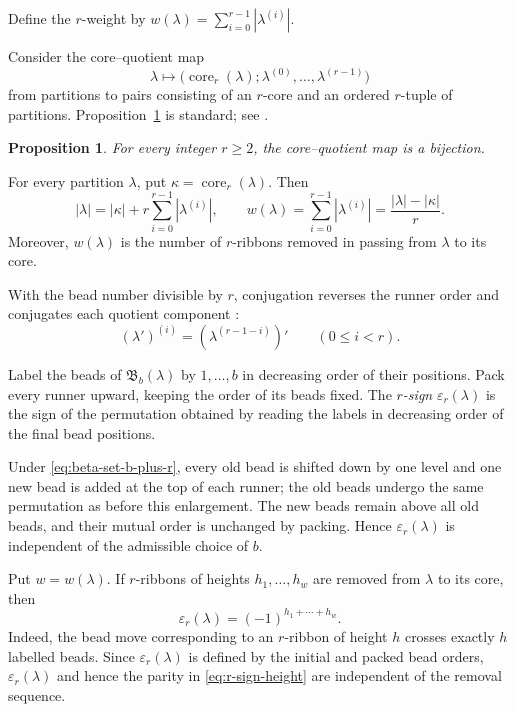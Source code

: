 \documentclass[12pt,reqno,a4paper]{amsart}
\numberwithin{equation}{section}
\numberwithin{figure}{section}
\theoremstyle{plain}
\newtheorem{proposition}[theorem]{Proposition}
\theoremstyle{definition}
\newcommand{\eps}{\varepsilon}
\begin{document}
Define the $r$-weight by
$w(\lambda)=\sum_{i=0}^{r-1}|\lambda^{(i)}|$.

Consider the core--quotient map
\[
 \lambda\longmapsto
 \bigl(\operatorname{core}_r(\lambda);
       \lambda^{(0)},\ldots,\lambda^{(r-1)}\bigr)
\]
from partitions to pairs consisting of an $r$-core and an ordered
$r$-tuple of partitions.
Proposition~\ref{prop:core-quotient-correspondence} is standard; see
\cite[Chapter~I, \S1, Example~8(b), (c), and~(g)]{Macdonald}.

\begin{proposition}
\label{prop:core-quotient-correspondence}
For every integer $r\geq2$, the core--quotient map is a bijection.
\end{proposition}

For every partition $\lambda$, put
$\kappa=\operatorname{core}_r(\lambda)$.  Then
\begin{equation}\label{eq:core-weight-size}
 |\lambda|=|\kappa|+r\sum_{i=0}^{r-1}|\lambda^{(i)}|,
 \qquad
 w(\lambda)=\sum_{i=0}^{r-1}|\lambda^{(i)}|
 =\frac{|\lambda|-|\kappa|}{r}.
\end{equation}
Moreover, $w(\lambda)$ is the number of $r$-ribbons removed in
passing from $\lambda$ to its core.

With the bead number divisible by $r$, conjugation reverses the
runner order and conjugates each quotient component
\cite[Section~1.1.1, p.~442]{Fayers}:
\begin{equation}\label{eq:quotient-conjugation}
(\lambda')^{(i)}=(\lambda^{(r-1-i)})'
\qquad(0\leq i<r).
\end{equation}

Label the beads of $\mathfrak B_b(\lambda)$ by $1,\ldots,b$ in
decreasing order of their positions.  Pack every runner upward,
keeping the order of its beads fixed.  The \emph{$r$-sign}
$\eps_r(\lambda)$ is the sign of the permutation obtained by reading
the labels in decreasing order of the final bead positions.

Under
\eqref{eq:beta-set-b-plus-r}, every old bead is shifted down by one
level and one new bead is added at the top of each runner;
the old beads undergo the same permutation as before this enlargement.
The new beads remain above all old beads, and their mutual order is
unchanged by packing.  Hence $\eps_r(\lambda)$ is independent of the
admissible choice of $b$.

Put $w=w(\lambda)$.  If $r$-ribbons of heights $h_1,\ldots,h_w$ are removed from
$\lambda$ to its core, then
\begin{equation}\label{eq:r-sign-height}
\eps_r(\lambda)=(-1)^{h_1+\cdots+h_w}.
\end{equation}
Indeed, the bead move corresponding to an $r$-ribbon of height $h$ crosses
exactly $h$ labelled beads.  Since $\eps_r(\lambda)$ is defined by
the initial and packed bead orders, $\eps_r(\lambda)$ and hence the
parity in \eqref{eq:r-sign-height} are independent of the removal
sequence.
\end{document}
